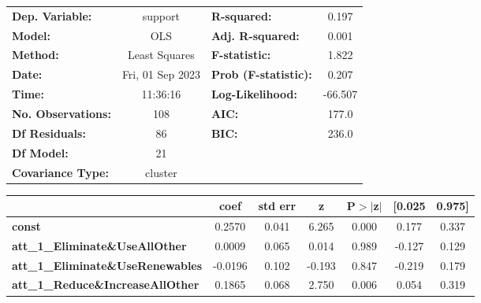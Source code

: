 \begin{center}
\begin{tabular}{lclc}
\toprule
\textbf{Dep. Variable:}                     &     support      & \textbf{  R-squared:         } &     0.197   \\
\textbf{Model:}                             &       OLS        & \textbf{  Adj. R-squared:    } &     0.001   \\
\textbf{Method:}                            &  Least Squares   & \textbf{  F-statistic:       } &     1.822   \\
\textbf{Date:}                              & Fri, 01 Sep 2023 & \textbf{  Prob (F-statistic):} &    0.207    \\
\textbf{Time:}                              &     11:36:16     & \textbf{  Log-Likelihood:    } &   -66.507   \\
\textbf{No. Observations:}                  &         108      & \textbf{  AIC:               } &     177.0   \\
\textbf{Df Residuals:}                      &          86      & \textbf{  BIC:               } &     236.0   \\
\textbf{Df Model:}                          &          21      & \textbf{                     } &             \\
\textbf{Covariance Type:}                   &     cluster      & \textbf{                     } &             \\
\bottomrule
\end{tabular}
\begin{tabular}{lcccccc}
                                            & \textbf{coef} & \textbf{std err} & \textbf{z} & \textbf{P$> |$z$|$} & \textbf{[0.025} & \textbf{0.975]}  \\
\midrule
\textbf{const}                              &       0.2570  &        0.041     &     6.265  &         0.000        &        0.177    &        0.337     \\
\textbf{att\_1\_Eliminate\&UseAllOther}     &       0.0009  &        0.065     &     0.014  &         0.989        &       -0.127    &        0.129     \\
\textbf{att\_1\_Eliminate\&UseRenewables}   &      -0.0196  &        0.102     &    -0.193  &         0.847        &       -0.219    &        0.179     \\
\textbf{att\_1\_Reduce\&IncreaseAllOther}   &       0.1865  &        0.068     &     2.750  &         0.006        &        0.054    &        0.319     \\

\end{tabular}
\end{center}
